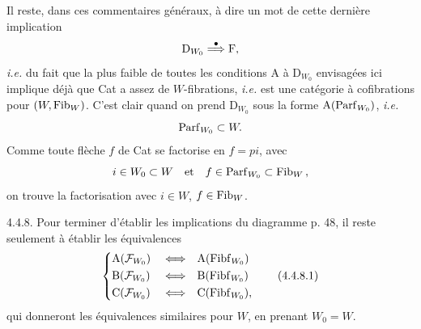 Il reste, dans ces commentaires généraux, à dire un mot de cette dernière implication
\[
\mathrm{D}_{W_0} \overset{\bullet}{\Longrightarrow} \mathrm{F},
\]
\textit{i.e.} du fait que la plus faible de toutes les conditions A à $\mathrm{D}_{W_0}$ envisagées ici implique déjà que Cat a assez de $W$-fibrations, \textit{i.e.} est une catégorie à cofibrations pour $(W, \mathrm{Fib}_W)$. C'est clair quand on prend $\mathrm{D}_{W_0}$ sous la forme $\mathrm{A}(\mathrm{Parf}_{W_0})$, \textit{i.e.}
\[
\mathrm{Parf}_{W_0} \subset W.
\]
Comme toute flèche $f$ de Cat se factorise en $f = pi$, avec
\[
i \in W_0 \subset W \quad\text{et}\quad f \in \Parf_{W_0} \subset \Fib_W\, , %
\]
on trouve la factorisation avec $i \in W$, $f \in \mathrm{Fib}_W$. %

4.4.8. Pour terminer d'établir les implications du diagramme p. 48, il reste seulement à établir les équivalences
\[
\left\{
\begin{aligned}
&\mathrm{A}(\mathcal{F}_{W_0}) &&\Longleftrightarrow &&\mathrm{A}(\mathrm{Fibf}_{W_0})\\
&\mathrm{B}(\mathcal{F}_{W_0}) &&\Longleftrightarrow &&\mathrm{B}(\mathrm{Fibf}_{W_0})\\
&\mathrm{C}(\mathcal{F}_{W_0}) &&\Longleftrightarrow &&\mathrm{C}(\mathrm{Fibf}_{W_0}),
\end{aligned}
\right.
\tag*{(4.4.8.1)}
\]
qui donneront les équivalences similaires pour $W$, en prenant $W_0 = W$.

